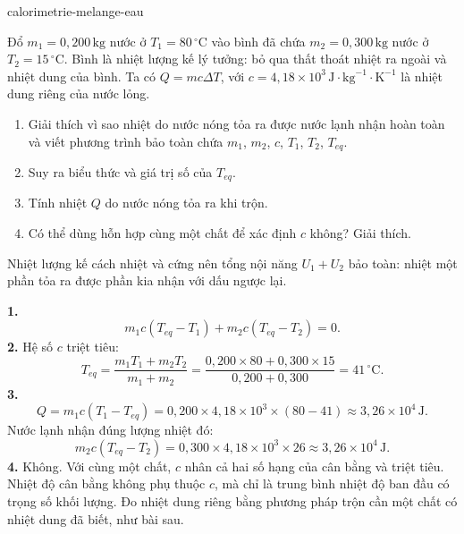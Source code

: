 \begin{exo}{calorimetrie-melange-eau}

Đổ $m_1=0{,}200\,\text{kg}$ nước ở $T_1=80\,^\circ\text{C}$ vào bình đã chứa $m_2=0{,}300\,\text{kg}$ nước ở $T_2=15\,^\circ\text{C}$. Bình là nhiệt lượng kế lý tưởng: bỏ qua thất thoát nhiệt ra ngoài và nhiệt dung của bình. Ta có $Q=mc\Delta T$, với $c=4{,}18\times10^3\,\text{J}\!\cdot\!\text{kg}^{-1}\!\cdot\!\text{K}^{-1}$ là nhiệt dung riêng của nước lỏng.
\begin{enumerate}
  \item Giải thích vì sao nhiệt do nước nóng tỏa ra được nước lạnh nhận hoàn toàn và viết phương trình bảo toàn chứa $m_1$, $m_2$, $c$, $T_1$, $T_2$, $T_{eq}$.
  \item Suy ra biểu thức và giá trị số của $T_{eq}$.
  \item Tính nhiệt $Q$ do nước nóng tỏa ra khi trộn.
  \item Có thể dùng hỗn hợp cùng một chất để xác định $c$ không? Giải thích.
\end{enumerate}
\begin{indication}
Nhiệt lượng kế cách nhiệt và cứng nên tổng nội năng $U_1+U_2$ bảo toàn: nhiệt một phần tỏa ra được phần kia nhận với dấu ngược lại.
\end{indication}
\begin{solution}
\textbf{1.}
\[
m_1c(T_{eq}-T_1)+m_2c(T_{eq}-T_2)=0.
\]
\textbf{2.} Hệ số $c$ triệt tiêu:
\[
T_{eq}=\frac{m_1T_1+m_2T_2}{m_1+m_2}
=\frac{0{,}200\times80+0{,}300\times15}{0{,}200+0{,}300}=41\,^\circ\text{C}.
\]
\textbf{3.}
\[
Q=m_1c(T_1-T_{eq})=0{,}200\times4{,}18\times10^3\times(80-41)
\approx3{,}26\times10^4\,\text{J}.
\]
Nước lạnh nhận đúng lượng nhiệt đó:
\[
m_2c(T_{eq}-T_2)=0{,}300\times4{,}18\times10^3\times26
\approx3{,}26\times10^4\,\text{J}.
\]
\textbf{4.} Không. Với cùng một chất, $c$ nhân cả hai số hạng của cân bằng và triệt tiêu. Nhiệt độ cân bằng không phụ thuộc $c$, mà chỉ là trung bình nhiệt độ ban đầu có trọng số khối lượng. Đo nhiệt dung riêng bằng phương pháp trộn cần một chất có nhiệt dung đã biết, như bài sau.
\end{solution}
\end{exo}

